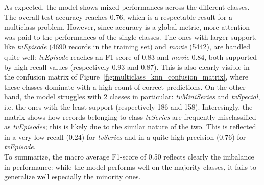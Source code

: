 As expected, the model shows mixed performances across the different classes. 
The overall test accuracy reaches 0.76, which is a respectable result for a multiclass problem. 
However, since accuracy is a global metric, more attention was paid to the performances of the single classes. 
The ones with larger support, like \textit{tvEpisode} (4690 records in the training set) and \textit{movie} (5442), are handled quite well: \textit{tvEpisode} reaches an F1-score of 0.83 and \textit{movie} 0.84, both supported by high recall values (respectively 0.93 and 0.87). 
This is also clearly visible in the confusion matrix of Figure~\ref{fig:multiclass_knn_confusion_matrix}, where these classes dominate with a high count of correct predictions. 
On the other hand, the model struggles with 2 classes in particular: \textit{tvMiniSeries} and \textit{tvSpecial}, i.e. the ones with the least support (respectively 186 and 158). 
Interesingly, the matrix shows how records belonging to class \textit{tvSeries} are frequently misclassified as \textit{tvEpisodes}; this is likely due to the similar nature of the two. 
This is reflected in a very low recall (0.24) for \textit{tvSeries} and in a quite high precision (0.76) for \textit{tvEpisode}.\\

To summarize, the macro average F1-score of 0.50 reflects clearly the imbalance in performance: while the model performs well on the majority classes, it fails to generalize well especially the minority ones.




